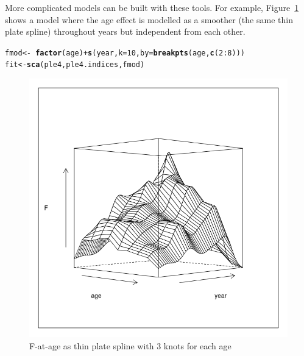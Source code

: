 \documentclass[a4paper,english,10pt]{article}\usepackage[]{graphicx}\usepackage[]{color}
\makeatletter
\def\maxwidth{ %
  \ifdim\Gin@nat@width>\linewidth
    \linewidth
  \else
    \Gin@nat@width
  \fi
}
\newcommand{\hlnum}[1]{\textcolor[rgb]{0.686,0.059,0.569}{#1}}%
\newcommand{\hlopt}[1]{\textcolor[rgb]{0,0,0}{#1}}%
\newcommand{\hlstd}[1]{\textcolor[rgb]{0.345,0.345,0.345}{#1}}%
\newcommand{\hlkwb}[1]{\textcolor[rgb]{0.69,0.353,0.396}{#1}}%
\newcommand{\hlkwc}[1]{\textcolor[rgb]{0.333,0.667,0.333}{#1}}%
\newcommand{\hlkwd}[1]{\textcolor[rgb]{0.737,0.353,0.396}{\textbf{#1}}}%
\newenvironment{kframe}{%
 \def\at@end@of@kframe{}%
 \ifinner\ifhmode%
  \def\at@end@of@kframe{\end{minipage}}%
  \begin{minipage}{\columnwidth}%
 \fi\fi%
 \def\FrameCommand##1{\hskip\@totalleftmargin \hskip-\fboxsep
 \colorbox{shadecolor}{##1}\hskip-\fboxsep
     \hskip-\linewidth \hskip-\@totalleftmargin \hskip\columnwidth}%
 \MakeFramed {\advance\hsize-\width
   \@totalleftmargin\z@ \linewidth\hsize
   \@setminipage}}%
 {\par\unskip\endMakeFramed%
 \at@end@of@kframe}
\newenvironment{knitrout}{}{} %
\makeatother
\begin{document}
More complicated models can be built with these tools. For example, Figure~\ref{fig:ageind} shows a model where the age effect is modelled as a smoother (the same thin plate spline) throughout years but independent from each other.

\begin{knitrout}
\color{fgcolor}\begin{kframe}
\begin{alltt}
\hlstd{fmod} \hlkwb{<-} \hlopt{~}\hlkwd{factor}\hlstd{(age)} \hlopt{+} \hlkwd{s}\hlstd{(year,} \hlkwc{k} \hlstd{=} \hlnum{10}\hlstd{,} \hlkwc{by} \hlstd{=} \hlkwd{breakpts}\hlstd{(age,} \hlkwd{c}\hlstd{(}\hlnum{2}\hlopt{:}\hlnum{8}\hlstd{)))}
\hlstd{fit} \hlkwb{<-} \hlkwd{sca}\hlstd{(ple4, ple4.indices, fmod)}
\end{alltt}
\end{kframe}
\end{knitrout}

\begin{knitrout}
\color{fgcolor}\begin{figure}[H]

{\centering \includegraphics[width=\maxwidth]{figure/ageind-1} 

}

\caption[F-at-age as thin plate spline with 3 knots for each age]{F-at-age as thin plate spline with 3 knots for each age}\label{fig:ageind}
\end{figure}


\end{knitrout}
\end{document}
